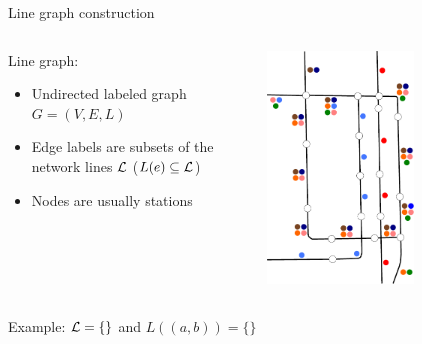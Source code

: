 \documentclass{beamer}
\begin{document}
\begin{frame}{Line graph construction}
	\begin{columns}[T]
		\begin{column}[T]{0.5\textwidth}
			Line graph:
			\begin{itemize}
				\item Undirected labeled graph $G = (V, E, L)$
				\item Edge labels are subsets of the network lines $\cal L$ ($L(e) \subseteq \cal L$)
				\item Nodes are \alert{usually} stations
			\end{itemize}
		\end{column}
		\begin{column}{0.5\textwidth}
			\centering\includegraphics[width=0.6\textwidth]{figures/chicago_linegraph.pdf}
		\end{column}
	\end{columns}


	Example: $\cal L = \{\}$ and $L((a, b)) = \{\}$
\end{frame}
\end{document}
